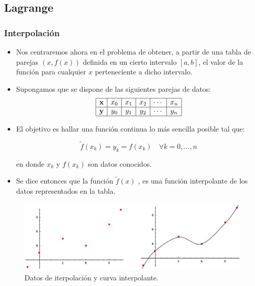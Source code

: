 \documentclass{beamer}
\begin{document}
\subsection{Lagrange}
\frame
{
\frametitle{Interpolaci\'on}
\begin{itemize}
 \item<1-> Nos centraremos ahora en el problema de obtener, a partir de una tabla de parejas $(x,f(x))$ definida en un cierto intervalo $[a,b]$, el valor de la funci\'on para cualquier $x$ perteneciente a dicho intervalo.
 
 \item<2-> Supongamos que se dispone de las siguientes parejas de datos:
$$
\begin{array}{|c|c|c|c|c|c|}\hline
  \textbf{x} & x_0 & x_1 & x_2 & \cdots & x_n\\\hline
  \textbf{y} & y_0 & y_1 & y_2 & \cdots & y_n\\\hline
 \end{array}
$$
\end{itemize}
}
\frame
{
  \begin{itemize}
    \item El objetivo es hallar una funci\'on continua lo m\'as sencilla posible tal que:
    \begin{block}{}
    $$
      \widetilde{f}(x_k) = y_k = f(x_k) \quad\forall k = 0,\ldots,n
    $$
    \end{block}
    en donde $x_k$ y $f(x_k)$ son datos conocidos.

    \item<2->Se dice entonces que la funci\'on $\widetilde{f}(x)$ , es una funci\'on interpolante de los datos representados en la tabla.
\end{itemize}
}
\frame
{
\begin{figure}
 \includegraphics[scale=0.37]{img1.eps}
 \caption{Datos de iterpolaci\'on y curva interpolante.}
\end{figure}
}
\end{document}
